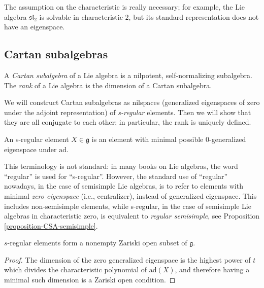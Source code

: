 \begin{remark}
 \label{remark-Lie-positive-characteristic}
The assumption on the characteristic is really necessary; for example, the Lie algebra $\mathfrak{sl}_2$ is solvable in characteristic $2$, but its standard representation does not have an eigenspace.
\end{remark}

\subsection{Cartan subalgebras}
\label{subsection-CSA}

\begin{definition}
 \label{definition-CSA}
A {\it Cartan subalgebra} of a Lie algebra is a nilpotent, self-normalizing subalgebra. The {\it rank} of a Lie algebra is the dimension of a Cartan subalgebra.
\end{definition}

We will construct Cartan subalgebras as nilspaces (generalized eigenspaces of zero under the adjoint representation) of \emph{s-regular} elements. Then we will show that they are all conjugate to each other; in particular, the rank is uniquely defined.

\begin{definition}
\label{definition-s-regular}
 An s-regular element $X\in\mathfrak g$ is an element with minimal possible $0$-generalized eigenspace under $\text{ad}$.
\end{definition}

This terminology is not standard: in many books on Lie algebras, the word ``regular'' is used for ``s-regular''. However, the standard use of ``regular'' nowadays, in the case of semisimple Lie algebras, is to refer to elements with minimal \emph{zero eigenspace} (i.e., centralizer), instead of generalized eigenspace. This includes non-semisimple elements, while s-regular, in the case of semisimple Lie algebras in characteristic zero, is equivalent to \emph{regular semisimple}, see Proposition \ref{proposition-CSA-semisimple}.



\begin{lemma}
\label{lemma-sregular-exist}
$s$-regular elements form a nonempty Zariski open subset of $\mathfrak g$. 
\end{lemma}

\begin{proof}
The dimension of the zero generalized eigenspace is the highest power of $t$ which divides the characteristic polynomial of $\text{ad}(X)$, and therefore having a minimal such dimension is a Zariski open condition.
\end{proof}



